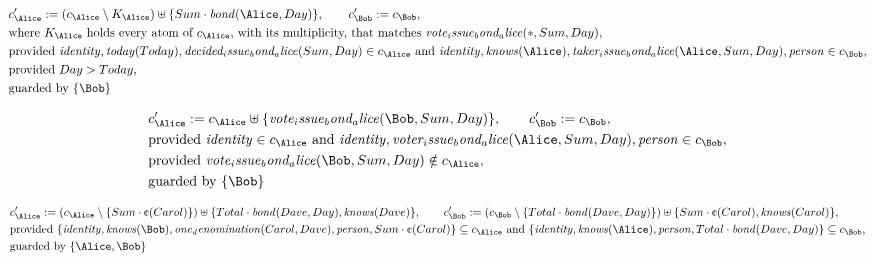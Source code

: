 \begin{align*}
&
c'_
{
\Alice
}
 := 
(
c_
{
\Alice
}
 \setminus K_
{
\Alice
}
) \uplus 
\{
Sum
\cdot
\mathit{
bond
}
(
\Alice
,
Day
)
\}
, \qquad 
c'_
{
\Bob
}
 := 
c_
{
\Bob
}
,\\
&
\text{where } K_
{
\Alice
}
 \text{ holds every atom of } c_
{
\Alice
}
 \text{, with its multiplicity, that matches } 
\mathit{
vote_issue_bond_alice
}
(
\ast
,
Sum
,
Day
)
,\\
&
\text{provided } 
\mathit{
identity
}
,
\mathit{
today
}
(
Today
)
,
\mathit{
decided_issue_bond_alice
}
(
Sum
,
Day
)
 \in c_
{
\Alice
}
 \text{ and } 
\mathit{
identity
}
,
\mathit{
knows
}
(
\Alice
)
,
\mathit{
taker_issue_bond_alice
}
(
\Alice
,
Sum
,
Day
)
,
\mathit{
person
}
 \in c_
{
\Bob
}
,\\
&
\text{provided } 
Day
>
Today
,\\
&
\text{guarded by } \{
\Bob
\}
\end{align*}

\begin{align*}
&
c'_
{
\Alice
}
 := 
c_
{
\Alice
}
 \uplus 
\{
\mathit{
vote_issue_bond_alice
}
(
\Bob
,
Sum
,
Day
)
\}
, \qquad 
c'_
{
\Bob
}
 := 
c_
{
\Bob
}
,\\
&
\text{provided } 
\mathit{
identity
}
 \in c_
{
\Alice
}
 \text{ and } 
\mathit{
identity
}
,
\mathit{
voter_issue_bond_alice
}
(
\Alice
,
Sum
,
Day
)
,
\mathit{
person
}
 \in c_
{
\Bob
}
,\\
&
\text{provided } 
\mathit{
vote_issue_bond_alice
}
(
\Bob
,
Sum
,
Day
)
 \notin c_
{
\Alice
}
,\\
&
\text{guarded by } \{
\Bob
\}
\end{align*}

\begin{align*}
&
c'_
{
\Alice
}
 := 
(c_
{
\Alice
}
 \setminus 
\{
Sum
\cdot
\text{\textcent}
(
Carol
)
\}
) \uplus 
\{
Total
\cdot
\mathit{
bond
}
(
Dave
,
Day
)
,
\mathit{
knows
}
(
Dave
)
\}
, \qquad 
c'_
{
\Bob
}
 := 
(c_
{
\Bob
}
 \setminus 
\{
Total
\cdot
\mathit{
bond
}
(
Dave
,
Day
)
\}
) \uplus 
\{
Sum
\cdot
\text{\textcent}
(
Carol
)
,
\mathit{
knows
}
(
Carol
)
\}
,\\
&
\text{provided } 
\{
\mathit{
identity
}
,
\mathit{
knows
}
(
\Bob
)
,
\mathit{
one_denomination
}
(
Carol
,
Dave
)
,
\mathit{
person
}
,
Sum
\cdot
\text{\textcent}
(
Carol
)
\}
 \subseteq c_
{
\Alice
}
 \text{ and } 
\{
\mathit{
identity
}
,
\mathit{
knows
}
(
\Alice
)
,
\mathit{
person
}
,
Total
\cdot
\mathit{
bond
}
(
Dave
,
Day
)
\}
 \subseteq c_
{
\Bob
}
,\\
&
\text{guarded by } \{
\Alice
,
\Bob
\}
\end{align*}
